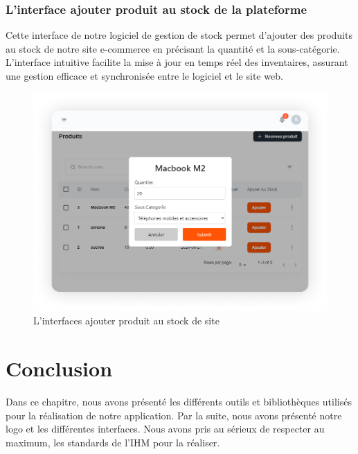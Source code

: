 \documentclass[edit,12pt,a4paper,ChapStyle,oneside,doubleinterligne]{report}
\begin{document}
\subsubsection{L'interface ajouter produit au stock de la plateforme}
Cette interface de notre logiciel de gestion de stock permet d'ajouter des produits au stock de notre site e-commerce en précisant la quantité et la sous-catégorie. L'interface intuitive facilite la mise à jour en temps réel des inventaires, assurant une gestion efficace et synchronisée entre le logiciel et le site web.
  \begin{figure} [H]
    \centering
    \includegraphics[width=1\textwidth]{images/ajouter produit au stock de site 1.png}
    \caption{L'interfaces ajouter produit au stock de site}
    \label{fig:ajouter produit au stock de site}
\end{figure}
\section{Conclusion}
Dans ce chapitre, nous avons présenté les différents outils et bibliothèques utilisés pour la réalisation de notre application.
Par la suite, nous avons présenté notre logo et les différentes interfaces. Nous avons pris au sérieux de respecter au maximum, les standards de l’IHM pour la réaliser.
\end{document}
